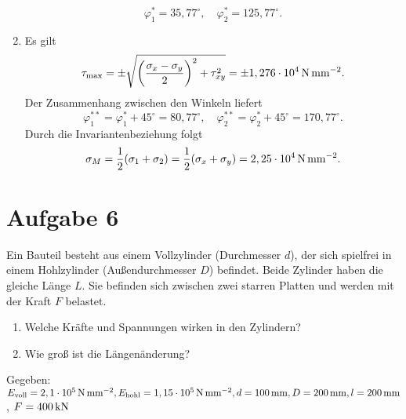 \documentclass{exercise}
\begin{document}
\begin{enumerate}
        \[
            \varphi_1^* = 35,77^\circ, \quad \varphi_2^* = 125,77^\circ.
        \]
        \item Es gilt
        \[
            \tau_{\text{max}} = \pm\sqrt{\parentheses*{\frac{\sigma_x - \sigma_y}{2}}^2 + \tau_{xy}^2} = \pm 1,276 \cdot 10^4\sis{\newton\per\milli\meter\squared}.
        \]
        Der Zusammenhang zwischen den Winkeln liefert
        \[
            \varphi_1^{**} = \varphi_1^* + 45^\circ = 80,77^\circ, \quad \varphi_2^{**} = \varphi_2^* + 45^\circ = 170,77^\circ.
        \]
        Durch die Invariantenbeziehung folgt
        \[
            \sigma_M = \frac{1}{2}\parentheses*{\sigma_1 + \sigma_2} = \frac{1}{2}\parentheses*{\sigma_x + \sigma_y} = 2,25 \cdot 10^4\sis{\newton\per\milli\meter\squared}.
        \]
    \end{enumerate}


    \section*{Aufgabe 6}

    \begin{problem}
        Ein Bauteil besteht aus einem Vollzylinder (Durchmesser \(d\)), der sich spielfrei in einem Hohlzylinder (Außendurchmesser \(D\)) befindet.
        Beide Zylinder haben die gleiche Länge \(L\).
        Sie befinden sich zwischen zwei starren Platten und werden mit der Kraft \(F\) belastet.
        \begin{enumerate}
            \item Welche Kräfte und Spannungen wirken in den Zylindern?
            \item Wie groß ist die Längenänderung?
        \end{enumerate}
        Gegeben: \(E_{\text{voll}} = 2,1 \cdot 10^5\sis{\newton\per\milli\meter\squared}, E_{\text{hohl}} = 1,15 \cdot 10^5\sis{\newton\per\milli\meter\squared}, d = 100\sis{\milli\meter}, D = 200\sis{\milli\meter}, l = 200\sis{\milli\meter}\), \(F = 400\sis{\kilo\newton}\)
    \end{problem}
\end{document}
